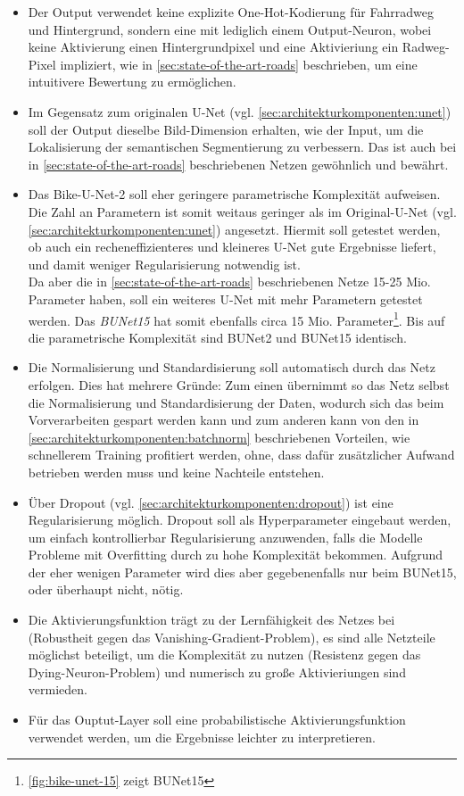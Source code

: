 \begin{itemize}
	\item Der Output verwendet keine explizite One-Hot-Kodierung für Fahrradweg und Hintergrund, 
	sondern eine mit lediglich einem Output-Neuron, wobei keine Aktivierung einen Hintergrundpixel 
	und eine Aktivieriung ein Radweg-Pixel impliziert, wie in \autoref{sec:state-of-the-art-roads} beschrieben, 
	um eine intuitivere Bewertung zu ermöglichen. 
	\item Im Gegensatz zum originalen U-Net (vgl. \autoref{sec:architekturkomponenten:unet}) soll der 
	Output dieselbe Bild-Dimension erhalten, wie der Input, um die Lokalisierung der semantischen Segmentierung zu verbessern.
	Das ist auch bei in \autoref{sec:state-of-the-art-roads} beschriebenen Netzen gewöhnlich und bewährt.
	\item 
	Das Bike-U-Net-2 soll eher geringere parametrische Komplexität aufweisen. 
	Die Zahl an Parametern ist somit weitaus geringer als im Original-U-Net (vgl. \autoref{sec:architekturkomponenten:unet}) angesetzt. 
	Hiermit soll getestet werden, ob auch ein recheneffizienteres und kleineres U-Net gute Ergebnisse liefert, 
	und damit weniger Regularisierung notwendig ist. \\
	Da aber die in \autoref{sec:state-of-the-art-roads} beschriebenen Netze 15-25 Mio. Parameter haben, 
	soll ein weiteres U-Net mit mehr Parametern getestet werden. Das \textit{\ac{BUNet15}} hat somit ebenfalls circa 15 Mio. 
	Parameter\footnote{\autoref{fig:bike-unet-15} zeigt \ac{BUNet15}}.
	Bis auf die parametrische Komplexität sind \ac{BUNet2} und \ac{BUNet15} identisch.
	\item Die Normalisierung und Standardisierung soll automatisch durch das Netz erfolgen. 
	Dies hat mehrere Gründe: Zum einen übernimmt so das Netz selbst die Normalisierung und Standardisierung der Daten, 
	wodurch sich das beim Vorverarbeiten gespart werden kann und zum anderen kann von den in \autoref{sec:architekturkomponenten:batchnorm} 
	beschriebenen Vorteilen, wie schnellerem Training profitiert werden, 
	ohne, dass dafür zusätzlicher Aufwand betrieben werden muss und keine Nachteile entstehen.
	\item Über Dropout (vgl. \autoref{sec:architekturkomponenten:dropout}) ist eine Regularisierung möglich. Dropout soll als 
    Hyperparameter eingebaut werden, um einfach kontrollierbar Regularisierung anzuwenden, 
	falls die Modelle Probleme mit Overfitting durch zu hohe Komplexität bekommen. 
	Aufgrund der eher wenigen Parameter wird dies aber gegebenenfalls nur beim \ac{BUNet15}, 
	oder überhaupt nicht, nötig.
	\item Die Aktivierungsfunktion trägt zu der Lernfähigkeit des Netzes bei (Robustheit gegen das Vanishing-Gradient-Problem), 
	es sind alle Netzteile möglichst beteiligt, um die Komplexität zu nutzen (Resistenz gegen das Dying-Neuron-Problem) und
	numerisch zu große Aktivieriungen sind vermieden. 
	\item Für das Ouptut-Layer soll eine probabilistische Aktivierungsfunktion verwendet werden, 
	um die Ergebnisse leichter zu interpretieren.
\end{itemize}

